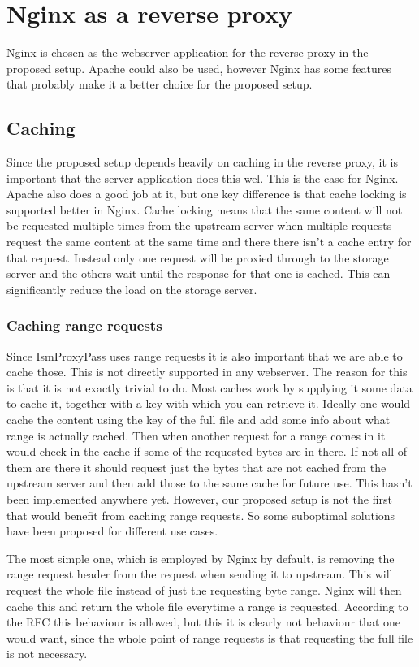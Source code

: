 \documentclass[twoside,openright]{uva-bachelor-thesis}
\begin{document}
\section{Nginx as a reverse proxy}
Nginx is chosen as the webserver application for the reverse proxy in the
proposed setup. Apache could also be used, however Nginx has some features that
probably make it a better choice for the proposed setup.

\subsection{Caching} \label{sec:caching}
Since the proposed setup depends heavily on caching in the reverse proxy, it is
important that the server application does this wel. This is the case for Nginx.
Apache also does a good job at it, but one key difference is that cache locking is
supported better in Nginx. Cache locking means that the same content will not be
requested multiple times from the upstream server when multiple requests request
the same content at the same time and there there isn't a cache entry for that
request. Instead only one request will be proxied through to the storage server
and the others wait until the response for that one is cached. This can
significantly reduce the load on the storage server.



\subsubsection{Caching range requests}
Since IsmProxyPass uses range requests it is also important that we are able to
cache those. This is not directly supported in any webserver. The reason for
this is that it is not exactly trivial to do. Most caches work by supplying it
some data to cache it, together with a key with which you can retrieve it.
Ideally one would cache the content using the key of the full file and add some
info about what range is actually cached. Then when another request for a range
comes in it would check in the cache if some of the requested bytes are in
there. If not all of them are there it should request just the bytes that are
not cached from the upstream server and then add those to the same cache for
future use. This hasn't been implemented anywhere yet. However, our proposed
setup is not the first that would benefit from caching range requests. So some
suboptimal solutions have been proposed for different use cases.

The most simple one, which is employed by Nginx by default,
is removing the range request header from the request when sending it to
upstream. This will request the whole file instead of just the requesting byte
range. Nginx will then cache this and return the whole file everytime a range is
requested. According to the RFC this behaviour is allowed, but this it is
clearly not behaviour that one would want, since the whole point of range
requests is that requesting the full file is not necessary.
\end{document}
